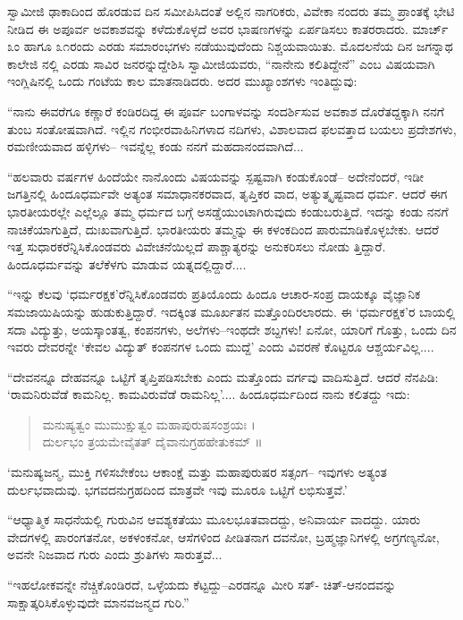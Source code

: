 ಸ್ವಾಮೀಜಿ ಢಾಕಾದಿಂದ ಹೊರಡುವ ದಿನ ಸಮೀಪಿಸಿದಂತೆ ಅಲ್ಲಿನ ನಾಗರಿಕರು, ವಿವೇಕಾ ನಂದರು ತಮ್ಮ ಪ್ರಾಂತಕ್ಕೆ ಭೇಟಿ ನೀಡಿದ ಈ ಅಪೂರ್ವ ಅವಕಾಶವನ್ನು ಕಳೆದುಕೊಳ್ಳದೆ ಅವರ ಭಾಷಣಗಳನ್ನು ಏರ್ಪಡಿಸಲು ಕಾತರರಾದರು. ಮಾರ್ಚ್ ೩ಂ ಹಾಗೂ ೩೧ರಂದು ಎರಡು ಸಮಾರಂಭಗಳು ನಡೆಯುವುದೆಂದು ನಿಶ್ಚಯವಾಯಿತು. ಮೊದಲನೆಯ ದಿನ ಜಗನ್ನಾಥ ಕಾಲೇಜಿ ನಲ್ಲಿ ಎರಡು ಸಾವಿರ ಜನರನ್ನುದ್ದೇಶಿಸಿ ಸ್ವಾಮೀಜಿಯವರು, “ನಾನೇನು ಕಲಿತಿದ್ದೇನೆ” ಎಂಬ ವಿಷಯವಾಗಿ ಇಂಗ್ಲಿಷಿನಲ್ಲಿ ಒಂದು ಗಂಟೆಯ ಕಾಲ ಮಾತನಾಡಿದರು. ಅದರ ಮುಖ್ಯಾಂಶಗಳು ಇಂತಿದ್ದುವು:

“ನಾನು ಈವರೆಗೂ ಕಣ್ಣಾರೆ ಕಂಡಿರದಿದ್ದ ಈ ಪೂರ್ವ ಬಂಗಾಳವನ್ನು ಸಂದರ್ಶಿಸುವ ಅವಕಾಶ ದೊರೆತದ್ದಕ್ಕಾಗಿ ನನಗೆ ತುಂಬ ಸಂತೋಷವಾಗಿದೆ. ಇಲ್ಲಿನ ಗಂಭೀರವಾಹಿನಿಗಳಾದ ನದಿಗಳು, ವಿಶಾಲವಾದ ಫಲವತ್ತಾದ ಬಯಲು ಪ್ರದೇಶಗಳು, ರಮಣೀಯವಾದ ಹಳ್ಳಿಗಳು– ಇವನ್ನೆಲ್ಲ ಕಂಡು ನನಗೆ ಮಹದಾನಂದವಾಗಿದೆ... 

“ಹಲವಾರು ವರ್ಷಗಳ ಹಿಂದೆಯೇ ನಾನೊಂದು ವಿಷಯವನ್ನು ಸ್ಪಷ್ಟವಾಗಿ ಕಂಡುಕೊಂಡೆ– ಅದೇನೆಂದರೆ, ಇಡೀ ಜಗತ್ತಿನಲ್ಲಿ ಹಿಂದೂಧರ್ಮವೇ ಅತ್ಯಂತ ಸಮಾಧಾನಕರವಾದ, ತೃಪ್ತಿಕರ ವಾದ, ಅತ್ಯುತ್ಕೃಷ್ಟವಾದ ಧರ್ಮ. ಆದರೆ ಈಗ ಭಾರತೀಯರಲ್ಲೇ ಎಲ್ಲೆಲ್ಲೂ ತಮ್ಮ ಧರ್ಮದ ಬಗ್ಗೆ ಅಸಡ್ಡೆಯುಂಟಾಗಿರುವುದು ಕಂಡುಬರುತ್ತಿದೆ. ಇದನ್ನು ಕಂಡು ನನಗೆ ನಾಚಿಕೆಯಾಗುತ್ತಿದೆ, ದುಃಖವಾಗುತ್ತಿದೆ. ಭಾರತೀಯರು ತಮ್ಮನ್ನು ಈ ಕಳಂಕದಿಂದ ಪಾರುಮಾಡಿಕೊಳ್ಳಬೇಕು. ಆದರೆ ಇತ್ತ ಸುಧಾರಕರೆನ್ನಿಸಿಕೊಂಡವರು ವಿವೇಚನೆಯಿಲ್ಲದೆ ಪಾಶ್ಚಾತ್ಯರನ್ನು ಅನುಕರಿಸಲು ನೋಡು ತ್ತಿದ್ದಾರೆ. ಹಿಂದೂಧರ್ಮವನ್ನು ತಲೆಕೆಳಗು ಮಾಡುವ ಯತ್ನದಲ್ಲಿದ್ದಾರೆ....

“ಇನ್ನು ಕೆಲವು ‘ಧರ್ಮರಕ್ಷಕ’ರೆನ್ನಿಸಿಕೊಂಡವರು ಪ್ರತಿಯೊಂದು ಹಿಂದೂ ಆಚಾರ-ಸಂಪ್ರ ದಾಯಕ್ಕೂ ವೈಜ್ಞಾನಿಕ ಸಮಜಾಯಿಷಿಯನ್ನು ಹುಡುಕುತ್ತಿದ್ದಾರೆ. ಇದಕ್ಕಿಂತ ಮೂರ್ಖತನ ಮತ್ತೊಂದಿರಲಾರದು. ಈ ‘ಧರ್ಮರಕ್ಷಕ’ರ ಬಾಯಲ್ಲಿ ಸದಾ ವಿದ್ಯುತ್ತು, ಅಯಸ್ಕಾಂತತ್ವ, ಕಂಪನಗಳು, ಅಲೆಗಳು–ಇಂಥದೇ ಶಬ್ದಗಳು! ಏನೋ, ಯಾರಿಗೆ ಗೊತ್ತು, ಒಂದು ದಿನ ಇವರು ದೇವರನ್ನೇ ‘ಕೇವಲ ವಿದ್ಯುತ್ ಕಂಪನಗಳ ಒಂದು ಮುದ್ದೆ’ ಎಂದು ವಿವರಣೆ ಕೊಟ್ಟರೂ ಆಶ್ಚರ್ಯವಿಲ್ಲ....

“ದೇವನನ್ನೂ ದೇಹವನ್ನೂ ಒಟ್ಟಿಗೆ ತೃಪ್ತಿಪಡಿಸಬೇಕು ಎಂದು ಮತ್ತೊಂದು ವರ್ಗವು ವಾದಿಸುತ್ತಿದೆ. ಆದರೆ ನೆನಪಿಡಿ: ‘ರಾಮನಿರುವೆಡೆ ಕಾಮನಿಲ್ಲ. ಕಾಮವಿರುವೆಡೆ ರಾಮನಿಲ್ಲ’.... ಹಿಂದೂಧರ್ಮದಿಂದ ನಾನು ಕಲಿತದ್ದು ಇದು:

\begin{verse}
ಮನುಷ್ಯತ್ವಂ ಮುಮುಕ್ಷುತ್ವಂ ಮಹಾಪುರುಷಸಂಶ್ರಯಃ ।\\ದುರ್ಲಭಂ ತ್ರಯಮೇವೈತತ್ ದೈವಾನುಗ್ರಹಹೇತುಕಮ್ ॥
\end{verse}

‘ಮನುಷ್ಯಜನ್ಮ, ಮುಕ್ತಿ ಗಳಿಸಬೇಕೆಂಬ ಆಕಾಂಕ್ಷೆ ಮತ್ತು ಮಹಾಪುರುಷರ ಸತ್ಸಂಗ– ಇವುಗಳು ಅತ್ಯಂತ ದುರ್ಲಭವಾದುವು. ಭಗವದನುಗ್ರಹದಿಂದ ಮಾತ್ರವೇ ಇವು ಮೂರೂ ಒಟ್ಟಿಗೆ ಲಭಿಸುತ್ತವೆ.’

“ಆಧ್ಯಾತ್ಮಿಕ ಸಾಧನೆಯಲ್ಲಿ ಗುರುವಿನ ಆವಶ್ಯಕತೆಯು ಮೂಲಭೂತವಾದದ್ದು, ಅನಿವಾರ್ಯ ವಾದದ್ದು. ಯಾರು ವೇದಗಳಲ್ಲಿ ಪಾರಂಗತನೋ, ಅಕಳಂಕನೋ, ಆಸೆಗಳಿಂದ ಪೀಡಿತನಾಗ ದವನೋ, ಬ್ರಹ್ಮಜ್ಞಾನಿಗಳಲ್ಲಿ ಅಗ್ರಗಣ್ಯನೋ, ಅವನೇ ನಿಜವಾದ ಗುರು ಎಂದು ಶ್ರುತಿಗಳು ಸಾರುತ್ತವೆ... 

“ಇಹಲೋಕವನ್ನೇ ನೆಚ್ಚಿಕೊಂಡಿರದೆ, ಒಳ್ಳೆಯದು ಕೆಟ್ಟದ್ದು–ಎರಡನ್ನೂ ಮೀರಿ ಸತ್​- ಚಿತ್​-ಆನಂದವನ್ನು ಸಾಕ್ಷಾತ್ಕರಿಸಿಕೊಳ್ಳುವುದೇ ಮಾನವಜನ್ಮದ ಗುರಿ.”

